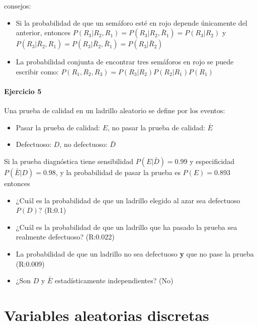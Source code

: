 \documentclass[
]{book}
\providecommand{\tightlist}{%
  \setlength{\itemsep}{0pt}\setlength{\parskip}{0pt}}
\begin{document}
consejos:

\begin{itemize}
\item
  Si la probabilidad de que un semáforo esté en rojo depende únicamente del anterior, entonces
  \(P(R_3|R_2,R_1)=P(R_3|R_2,\bar{R}_1)=P(R_3|R_2)\) y \(P(R_3|\bar{R}_2,R_1)=P(R_3 |\bar{R}_2,\bar{R}_1)=P(R_3|\bar{R}_2)\)
\item
  La probabilidad conjunta de encontrar tres semáforos en rojo se puede escribir como:
  \(P(R_1,R_2,R_3)=P(R_3|R_2)P(R_2|R_1)P(R_1)\)
\end{itemize}

\hypertarget{ejercicio-5}{%
\subsubsection{Ejercicio 5}\label{ejercicio-5}}

Una prueba de calidad en un ladrillo aleatorio se define por los eventos:

\begin{itemize}
\tightlist
\item
  Pasar la prueba de calidad: \(E\), no pasar la prueba de calidad: \(\bar{E}\)
\item
  Defectuoso: \(D\), no defectuoso: \(\bar{D}\)
\end{itemize}

Si la prueba diagnóstica tiene sensibilidad \(P(E|\bar{D})=0.99\) y especificidad \(P(\bar{E}|D)=0.98\), y la probabilidad de pasar la prueba es \(P(E) =0.893\) entonces

\begin{itemize}
\item
  ¿Cuál es la probabilidad de que un ladrillo elegido al azar sea defectuoso \(P(D)\)? (R:0.1)
\item
  ¿Cuál es la probabilidad de que un ladrillo que ha pasado la prueba sea realmente defectuoso? (R:0.022)
\item
  La probabilidad de que un ladrillo no sea defectuoso \textbf{y} que no pase la prueba (R:0.009)
\item
  ¿Son \(D\) y \(\bar{E}\) estadísticamente independientes? (No)
\end{itemize}

\hypertarget{variables-aleatorias-discretas}{%
\chapter{Variables aleatorias discretas}\label{variables-aleatorias-discretas}}
\end{document}
